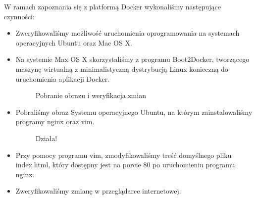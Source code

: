 \par{W ramach zapoznania się z platformą Docker wykonaliśmy następujące czynności:}

\begin{itemize}

\item Zweryfikowaliśmy możliwość uruchomienia oprogramowania na systemach operacyjnych Ubuntu oraz Mac OS X. 



\item Na systemie Max OS X skorzystaliśmy z programu Boot2Docker, tworzącego maszynę wirtualną z minimalistyczną dystrybucją Linux konieczną do uruchomienia aplikacji Docker.

\begin{figure}[h!tb]
\centering
{}
\caption{Pobranie obrazu i weryfikacja zmian}
\label{img:docker_tut2}
\end{figure}

\item Pobraliśmy obraz Systemu operacyjnego Ubuntu, na którym zainstalowaliśmy programy nginx oraz vim. 


\begin{figure}[h!tb]
\centering
{}
\caption{Działa!}
\label{img:docker_tut3}
\end{figure}

\item Przy pomocy programu vim, zmodyfikowaliśmy treść domyślnego pliku index.html, który dostępny jest na porcie 80 po uruchomieniu programu nginx. 

\item Zweryfikowaliśmy zmianę w przeglądarce internetowej. 


\end{itemize}

